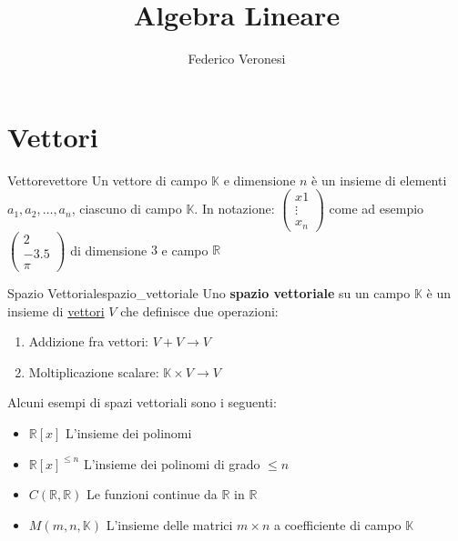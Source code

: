 \documentclass{article}
\title{Algebra Lineare}
\author{Federico Veronesi}
\begin{document}
\maketitle

{
    \hypersetup{linkcolor=black}
    \tableofcontents
}

\section{Vettori}

\begin{definition}{Vettore}{vettore}
    Un vettore di campo $\mathbb{K}$ e dimensione $n$ è un insieme di elementi $a_1, a_2, \dots , a_n$, ciascuno di campo $\mathbb{K}$. In notazione: $\begin{pmatrix} x1 \\ \vdots \\ x_n \end{pmatrix}$ come ad esempio $\begin{pmatrix} 2 \\ -3.5 \\ \pi \end{pmatrix}$ di dimensione $3$ e campo $\mathbb{R}$
\end{definition}

\begin{definition}{Spazio Vettoriale}{spazio_vettoriale}
    Uno \textbf{spazio vettoriale} su un campo $\mathbb{K}$ è un insieme di \hyperlink{def:vettore}{vettori} $V$ che definisce due operazioni:
    \begin{enumerate}
        \item Addizione fra vettori: $V + V \to V$
        \item Moltiplicazione scalare: $\mathbb{K} \times V \to V$
    \end{enumerate}
\end{definition}

Alcuni esempi di spazi vettoriali sono i seguenti:
\begin{itemize}
    \item $\mathbb{R} [x]$ L'insieme dei polinomi
    \item $\mathbb{R} [x]^{\le n}$ L'insieme dei polinomi di grado $\le n$
    \item $C(\mathbb{R}, \mathbb{R})$ Le funzioni continue da $\mathbb{R}$ in $\mathbb{R}$
    \item $M(m, n, \mathbb{K})$ L'insieme delle matrici $m \times n$ a coefficiente di campo $\mathbb{K}$
\end{itemize}
\end{document}
